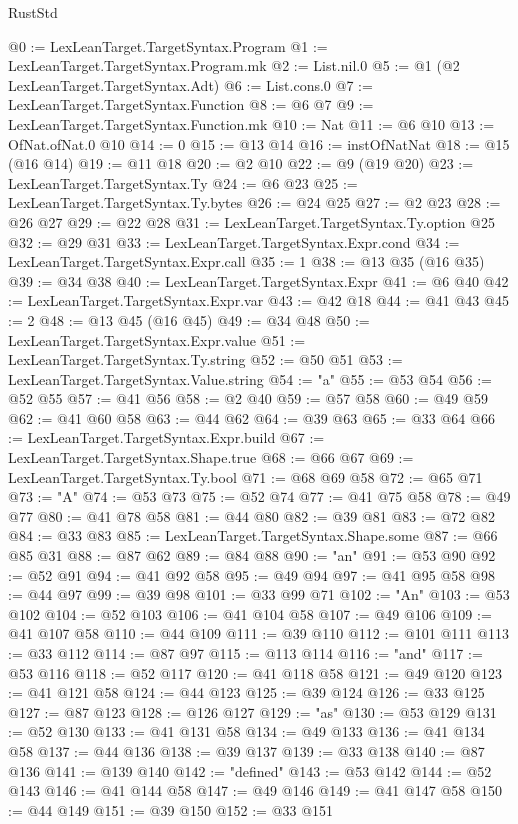 \begin{lexlean}{RustStd}
\begin{coremodule}
@0 := LexLeanTarget.TargetSyntax.Program
@1 := LexLeanTarget.TargetSyntax.Program.mk
@2 := List.nil.{0}
@5 := @1 (@2 LexLeanTarget.TargetSyntax.Adt)
@6 := List.cons.{0}
@7 := LexLeanTarget.TargetSyntax.Function
@8 := @6 @7
@9 := LexLeanTarget.TargetSyntax.Function.mk
@10 := Nat
@11 := @6 @10
@13 := OfNat.ofNat.{0} @10
@14 := 0
@15 := @13 @14
@16 := instOfNatNat
@18 := @15 (@16 @14)
@19 := @11 @18
@20 := @2 @10
@22 := @9 (@19 @20)
@23 := LexLeanTarget.TargetSyntax.Ty
@24 := @6 @23
@25 := LexLeanTarget.TargetSyntax.Ty.bytes
@26 := @24 @25
@27 := @2 @23
@28 := @26 @27
@29 := @22 @28
@31 := LexLeanTarget.TargetSyntax.Ty.option @25
@32 := @29 @31
@33 := LexLeanTarget.TargetSyntax.Expr.cond
@34 := LexLeanTarget.TargetSyntax.Expr.call
@35 := 1
@38 := @13 @35 (@16 @35)
@39 := @34 @38
@40 := LexLeanTarget.TargetSyntax.Expr
@41 := @6 @40
@42 := LexLeanTarget.TargetSyntax.Expr.var
@43 := @42 @18
@44 := @41 @43
@45 := 2
@48 := @13 @45 (@16 @45)
@49 := @34 @48
@50 := LexLeanTarget.TargetSyntax.Expr.value
@51 := LexLeanTarget.TargetSyntax.Ty.string
@52 := @50 @51
@53 := LexLeanTarget.TargetSyntax.Value.string
@54 := "a"
@55 := @53 @54
@56 := @52 @55
@57 := @41 @56
@58 := @2 @40
@59 := @57 @58
@60 := @49 @59
@62 := @41 @60 @58
@63 := @44 @62
@64 := @39 @63
@65 := @33 @64
@66 := LexLeanTarget.TargetSyntax.Expr.build
@67 := LexLeanTarget.TargetSyntax.Shape.true
@68 := @66 @67
@69 := LexLeanTarget.TargetSyntax.Ty.bool
@71 := @68 @69 @58
@72 := @65 @71
@73 := "A"
@74 := @53 @73
@75 := @52 @74
@77 := @41 @75 @58
@78 := @49 @77
@80 := @41 @78 @58
@81 := @44 @80
@82 := @39 @81
@83 := @72 @82
@84 := @33 @83
@85 := LexLeanTarget.TargetSyntax.Shape.some
@87 := @66 @85 @31
@88 := @87 @62
@89 := @84 @88
@90 := "an"
@91 := @53 @90
@92 := @52 @91
@94 := @41 @92 @58
@95 := @49 @94
@97 := @41 @95 @58
@98 := @44 @97
@99 := @39 @98
@101 := @33 @99 @71
@102 := "An"
@103 := @53 @102
@104 := @52 @103
@106 := @41 @104 @58
@107 := @49 @106
@109 := @41 @107 @58
@110 := @44 @109
@111 := @39 @110
@112 := @101 @111
@113 := @33 @112
@114 := @87 @97
@115 := @113 @114
@116 := "and"
@117 := @53 @116
@118 := @52 @117
@120 := @41 @118 @58
@121 := @49 @120
@123 := @41 @121 @58
@124 := @44 @123
@125 := @39 @124
@126 := @33 @125
@127 := @87 @123
@128 := @126 @127
@129 := "as"
@130 := @53 @129
@131 := @52 @130
@133 := @41 @131 @58
@134 := @49 @133
@136 := @41 @134 @58
@137 := @44 @136
@138 := @39 @137
@139 := @33 @138
@140 := @87 @136
@141 := @139 @140
@142 := "defined"
@143 := @53 @142
@144 := @52 @143
@146 := @41 @144 @58
@147 := @49 @146
@149 := @41 @147 @58
@150 := @44 @149
@151 := @39 @150
@152 := @33 @151

\end{coremodule}
\end{lexlean}

